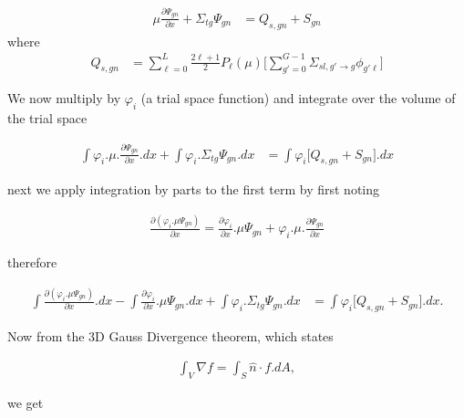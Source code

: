 \documentclass[11pt,letterpaper,titlepage]{article}
\numberwithin{equation}{section}
\newcommand{\beq}{\begin{equation*}
\begin{aligned}}
\newcommand{\eeq}{\end{aligned}
\end{equation*}}
\begin{document}
\begin{equation*} 
\begin{aligned}
\mu\frac{\partial \Psi_{gn}}{\partial x} 
+\Sigma_{tg}  \Psi_{gn}
&= Q_{s,gn}
+  S_{gn}
\end{aligned}
\end{equation*}
where
\begin{equation*} 
\begin{aligned}
Q_{s,gn} & = \sum_{\ell=0}^{L}\frac{2\ell+1}{2}P_\ell(\mu)
\biggr[ \sum_{g'=0}^{G-1}
\Sigma_{sl,g'{\to}g} 
  \phi_{g'\ell} 
\biggr]
\end{aligned}
\end{equation*}

We now multiply by $\varphi_i$ (a trial space function) and integrate over the volume of the trial space

\begin{equation*} 
\begin{aligned}
\int \varphi_i.\mu.\frac{\partial \Psi_{gn}}{\partial x} .dx
+\int \varphi_i.\Sigma_{tg}  \Psi_{gn}.dx
&= \int \varphi_i \biggr[Q_{s,gn}
+  S_{gn} \biggr].dx
\end{aligned}
\end{equation*}

next we apply integration by parts to the first term by first noting

\begin{equation*} 
\begin{aligned}
\frac{\partial (\varphi_i.\mu\Psi_{gn})}{\partial x} 
= \frac{\partial \varphi_i}{\partial x} . \mu\Psi_{gn} 
+ \varphi_i.\mu.\frac{\partial \Psi_{gn}}{\partial x}
\end{aligned}
\end{equation*}

therefore

\begin{equation*} 
\begin{aligned}
\int \frac{\partial (\varphi_i.\mu\Psi_{gn})}{\partial x}  .dx
-\int  \frac{\partial \varphi_i}{\partial x} . \mu\Psi_{gn}  .dx
+\int \varphi_i.\Sigma_{tg}  \Psi_{gn}.dx
&= \int \varphi_i \biggr[Q_{s,gn}
+  S_{gn} \biggr].dx.
\end{aligned}
\end{equation*}

Now from the 3D Gauss Divergence theorem, which states

\beq 
\int_V \nabla f = \int_S \hat{n}\cdot f .dA,
\eeq 

we get
\end{document}
